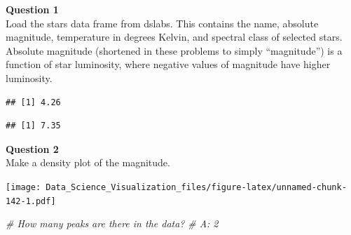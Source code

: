 \documentclass[
]{article}
\newenvironment{Shaded}{\begin{snugshade}}{\end{snugshade}}
\newcommand{\CommentTok}[1]{\textcolor[rgb]{0.56,0.35,0.01}{\textit{#1}}}
\newcommand{\KeywordTok}[1]{\textcolor[rgb]{0.13,0.29,0.53}{\textbf{#1}}}
\newcommand{\NormalTok}[1]{#1}
\newcommand{\OperatorTok}[1]{\textcolor[rgb]{0.81,0.36,0.00}{\textbf{#1}}}
\newcommand{\StringTok}[1]{\textcolor[rgb]{0.31,0.60,0.02}{#1}}
\begin{document}
\textbf{Question 1}\\
Load the stars data frame from dslabs. This contains the name, absolute
magnitude, temperature in degrees Kelvin, and spectral class of selected
stars. Absolute magnitude (shortened in these problems to simply
``magnitude'') is a function of star luminosity, where negative values
of magnitude have higher luminosity.

\begin{Shaded}
\end{Shaded}

\begin{verbatim}
## [1] 4.26
\end{verbatim}

\begin{Shaded}
\end{Shaded}

\begin{verbatim}
## [1] 7.35
\end{verbatim}

\textbf{Question 2}\\
Make a density plot of the magnitude.

\begin{Shaded}
\end{Shaded}

\texttt{[image: Data\_Science\_Visualization\_files/figure-latex/unnamed-chunk-142-1.pdf]}

\begin{Shaded}
\begin{Highlighting}[]
\CommentTok{# How many peaks are there in the data?}
\CommentTok{# A: 2}
\end{Highlighting}
\end{Shaded}
\end{document}
